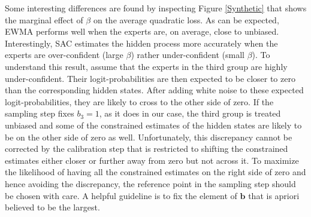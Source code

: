 \documentclass[aoas, preprint]{imsart}
\numberwithin{equation}{section}
\theoremstyle{plain}
\newcommand{\logit}{\text{logit}}
\begin{document}

%
%
Some interesting differences are found by inspecting Figure \ref{Synthetic} that shows the marginal effect of $\beta$ on the average quadratic loss. As can be expected, EWMA performs well when the experts are, on average, close to unbiased. Interestingly, SAC estimates the hidden process more accurately when the experts are over-confident (large $\beta$) rather under-confident (small $\beta$). To understand this result, assume that the experts in the third group are highly under-confident. Their logit-probabilities are then expected to be closer to zero than the corresponding hidden states. After adding white noise to these expected logit-probabilities, they are likely to cross to the other side of zero. If the sampling step fixes $b_3 = 1$, as it does in our case, the third group is treated unbiased and some of the constrained estimates of the hidden states are likely to be on the other side of zero as well. Unfortunately, this discrepancy cannot be corrected by the calibration step that is restricted to shifting the constrained estimates either closer or further away from zero but not across it. To maximize the likelihood of having all the constrained estimates on the right side of zero and hence avoiding the discrepancy, the reference point in the sampling step should be chosen with care. A helpful guideline is to fix the element of $\boldsymbol{b}$ that is apriori believed  to be the largest. 
\end{document}

